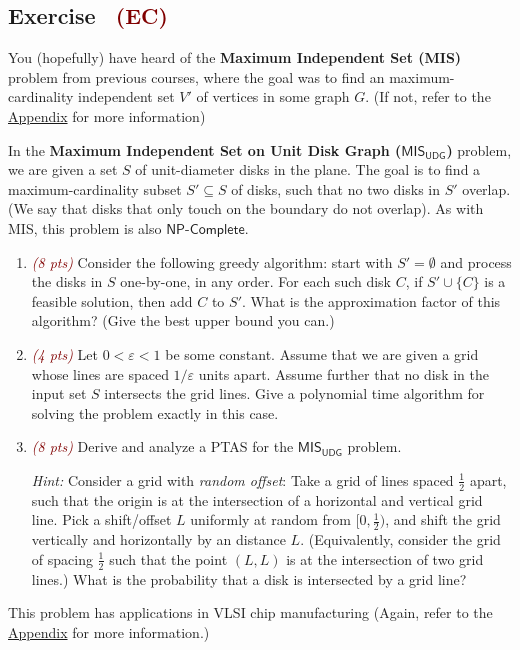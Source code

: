 \documentclass{article}
\newcounter{counter}
\newcommand{\Exercise}{Exercise \stepcounter{counter}\thecounter}
\begin{document}
\subsection*{\Exercise \ \textcolor{Maroon}{(EC)}}
    You (hopefully) have heard of the \textbf{Maximum Independent Set (\textsf{MIS})} problem from previous courses, where the goal was to find an maximum-cardinality independent set $V'$ of vertices in some graph $G$. (If not, refer to the \hyperref[sec:appendix]{Appendix} for more information)

    \vspace{3mm}
    In the \textbf{Maximum Independent Set on Unit Disk Graph ($\textsf{MIS}_{\textsf{UDG}}$)} problem, we are given a set \( S \) of unit-diameter disks in the plane. The goal is to find a maximum-cardinality subset \( S' \subseteq S \) of disks, such that no two disks in \( S' \) overlap. (We say that disks that only touch on the boundary do not overlap). As with \textsf{MIS}, this problem is also $\textsf{NP-Complete}$.
    
    \begin{enumerate}
       \item \textcolor{Maroon}{\textit{(8 pts)}} Consider the following greedy algorithm: start with \( S' = \emptyset \) and process the disks in \( S \) one-by-one, in any order. For each such disk \( C \), if \( S' \cup \{C\} \) is a feasible solution, then add \( C \) to \( S' \). What is the approximation factor of this algorithm? (Give the best upper bound you can.)
        
       \item \textcolor{Maroon}{\textit{(4 pts)}} Let \( 0 < \varepsilon < 1 \) be some constant. Assume that we are given a grid whose lines are spaced \( 1/\varepsilon \) units apart. Assume further that no disk in the input set \( S \) intersects the grid lines. Give a polynomial time algorithm for solving the problem exactly in this case.
        
       \item \textcolor{Maroon}{\textit{(8 pts)}} Derive and analyze a PTAS for the $\textsf{MIS}_{\textsf{UDG}}$ problem.

       \vspace{2mm}
        \textit{Hint:} Consider a grid with \textit{random offset}: Take a grid of lines spaced \( \frac{1}{2} \) apart, such that the origin is at the intersection of a horizontal and vertical grid line. Pick a shift/offset \( L \) uniformly at random from \( [0, \frac{1}{2}) \), and shift the grid vertically and horizontally by an distance \( L \). (Equivalently, consider the grid of spacing \( \frac{1}{2} \) such that the point \( (L, L) \) is at the intersection of two grid lines.) What is the probability that a disk is intersected by a grid line? 
    \end{enumerate}
    This problem has applications in VLSI chip manufacturing (Again, refer to the \hyperref[sec:appendix]{Appendix} for more information.)
\end{document}
